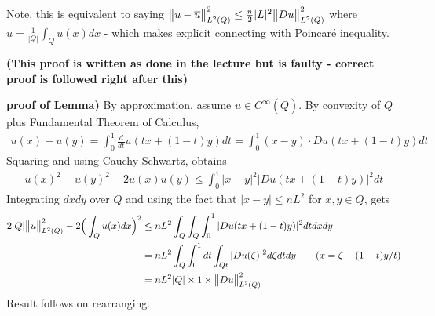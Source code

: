 \documentclass[12pt,a4paper]{report}
\newenvironment{proof}
{\begin{changemargin}{1cm}{0.5cm} 
	}%
	{\end{changemargin}
}
\begin{document}
Note, this is equivalent to saying $\bigl\lVert u - \overline{u}\bigr\rVert_{L^2(Q)}^2 \leq \frac{n}{2} |L|^2 \bigl\lVert Du\bigr\rVert_{L^2(Q)}^2$ where $\overline{u} = \frac{1}{|Q|} \int_Q u(x) dx$ - which makes explicit connecting with Poincar\'{e} inequality.
\s

\begin{proof}
\textbf{(This proof is written as done in the lecture but is faulty - correct proof is followed right after this)}
\s

\textbf{proof of Lemma)} By approximation, assume $u\in C^{\infty}(\bar{Q})$. By convexity of $Q$ plus Fundamental Theorem of Calculus,
\begin{align*}
u(x) -u(y) = \int_0^1 \frac{d}{dt} u(tx + (1-t)y) dt = \int_0^1 (x-y) \cdot Du(tx + (1-t)y) dt
\end{align*}
Squaring and using Cauchy-Schwartz, obtains
\begin{align*}
u(x)^2 + u(y)^2 - 2u(x) u(y) \leq \int_0^1 |x-y|^2 |Du(tx + (1-t)y)|^2 dt
\end{align*}
Integrating $dx dy$ over $Q$ and using the fact that $|x-y| \leq nL^2$ for $x,y\in Q$, gets
\begin{align*}
2|Q| \bigl\lVert u\bigr\rVert_{L^2(Q)}^2 -2 \Big( \int_Q u(x) dx\Big)^2 &\leq nL^2 \int_Q \int_Q \int_0^1 |Du(tx + (1-t)y)|^2 dtdxdy \\
&= nL^2 \int_Q  \int_0^1 dt \int_{Qt} |Du(\zeta)|^2 d\zeta dtdy \quad \quad  (x = \zeta - (1-t)y/t) \\
&= nL^2 |Q| \times 1 \times \bigl\lVert Du\bigr\rVert_{L^2(Q)}^2
\end{align*}
Result follows on rearranging.

\eop
\end{proof}
\s
\end{document}
